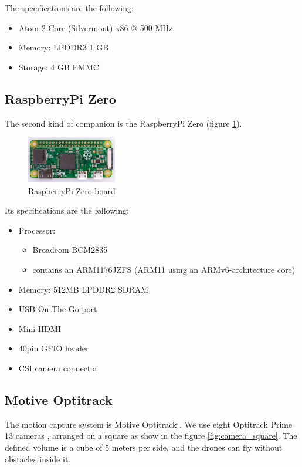 The specifications are the following:

\begin{itemize}
  \item Atom 2-Core (Silvermont) x86 @ 500 MHz
  \item Memory: LPDDR3 1 GB
  \item Storage: 4 GB EMMC
\end{itemize}

\subsection{RaspberryPi Zero}
The second kind of companion is the RaspberryPi Zero \cite{raspberry}
(figure \ref{fig:hardware_raspberry}).

\begin{figure}[h]
\centering
\includegraphics[width=0.35\textwidth]{chapters/chapter-03/figures/hardware_raspberry.jpg}
\caption{RaspberryPi Zero board}
\label{fig:hardware_raspberry}
\end{figure}

Its specifications are the following:

\begin{itemize}
  \item Processor:
        \begin{itemize}
          \item Broadcom BCM2835
          \item contains an ARM1176JZFS (ARM11 using an ARMv6-architecture core)
        \end{itemize}

  \item Memory: 512MB LPDDR2 SDRAM
  \item USB On-The-Go port
  \item Mini HDMI
  \item 40pin GPIO header
  \item CSI camera connector
\end{itemize}

\subsection{Motive Optitrack}
The motion capture system is Motive Optitrack \cite{optitrack}.
We use eight Optitrack Prime 13 cameras \cite{prime13},
arranged on a square as show in the figure \ref{fig:camera_square}. 
The defined volume is a cube of 5 meters per side,
and the drones can fly without obstacles inside it.

